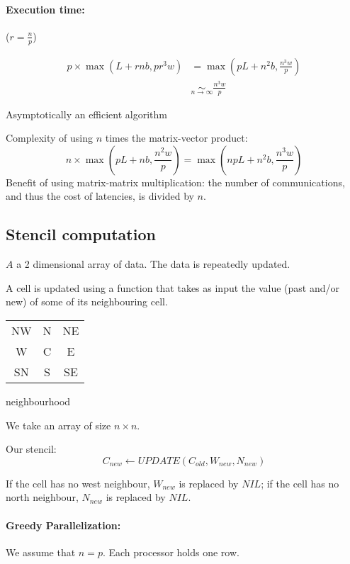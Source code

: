 \paragraph{Execution time:} ($r=\frac{n}{p}$)

\begin{align*}
p \times \max(L+rnb, pr^3 w) & = \max (pL+n^2 b,\frac{n^3 w}{p})\\
& \underset{n\to \infty}{\sim}\frac{n^3 w}{p}
\end{align*}

Asymptotically an efficient algorithm

Complexity of using $n$ times the matrix-vector product:
\[n \times \max(pL+nb,\frac{n^2w}{p}) = \max(npL+n^2b,\frac{n^3w}{p})\]
Benefit of using matrix-matrix multiplication: the number of communications, and thus the cost of latencies, is divided by $n$.

\subsection{Stencil computation}

$A$ a 2 dimensional array of data. %
The data is repeatedly updated.

A cell is updated using a function that takes as input the value (past and/or new) of some of its neighbouring cell.

\begin{center}
\begin{tabular}{c c c}
NW & N & NE\\
W & C & E\\
SN & S & SE
\end{tabular}

neighbourhood
\end{center}

We take an array of size $n\times n$.

Our stencil:
\[C_{new} \leftarrow UPDATE(C_{old},W_{new},N_{new})\]

If the cell has no west neighbour, $W_{new}$ is replaced by $NIL$; if the cell has no north neighbour, $N_{new}$ is replaced by $NIL$.

\begin{algorithm}[H]
\end{algorithm}

\paragraph{Greedy Parallelization:} We assume that $n=p$. Each processor holds one row.

